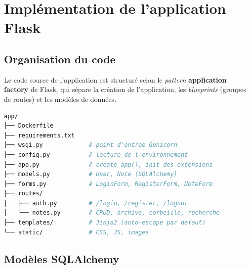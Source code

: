 \section{Implémentation de l'application Flask}

\subsection{Organisation du code}

Le code source de l'application est structuré selon le \emph{pattern}
\textbf{application factory} de Flask, qui sépare la création de
l'application, les \emph{blueprints} (groupes de routes) et les modèles
de données.

\begin{lstlisting}[language=bash, caption={Arborescence de l'application Flask.}]
app/
├── Dockerfile
├── requirements.txt
├── wsgi.py             # point d'entree Gunicorn
├── config.py           # lecture de l'environnement
├── app.py              # create_app(), init des extensions
├── models.py           # User, Note (SQLAlchemy)
├── forms.py            # LoginForm, RegisterForm, NoteForm
├── routes/
│   ├── auth.py         # /login, /register, /logout
│   └── notes.py        # CRUD, archive, corbeille, recherche
├── templates/          # Jinja2 (auto-escape par defaut)
└── static/             # CSS, JS, images
\end{lstlisting}

\subsection{Modèles SQLAlchemy}

